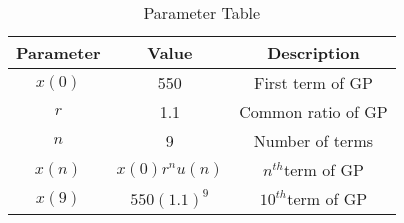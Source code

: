 \begin{table}[ht]
  \centering
  \begin{tabular}{|c|c|c|}
    \hline
   \textbf{ Parameter} & \textbf{Value} & \textbf{Description} \\
    \hline
    $x(0)$ & 550 & First term of GP \\
    \hline
    $r$ & 1.1 & Common ratio of GP \\
    \hline
    $n$ & 9 & Number of terms   \\
    \hline
     $x(n)$ & $x(0)r^{n}u(n) $ & $n^{th}$term of GP\\
     \hline
    $x(9)$ & $ 550(1.1)^9$ & $10^{th}$term of GP\\
    \hline
  \end{tabular}
  \vspace{2mm}
  \caption{Parameter Table}
  \label{tab:11.9.3.31}
\end{table}
